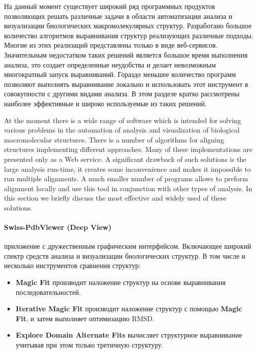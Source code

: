 \documentclass[a4paper, 12pt, titlepage, utf8]{extarticle}
\begin{document}
\begin{original}
На данный момент существует широкий ряд программных продуктов позволяющих решать
различные задачи в области автоматизации анализа и визуализации биологических
макромолекулярных структур. Разработано большое количество алгоритмов
выравнивания структур реализующих различные подходы. Многие из этих реализаций
представлены только в виде веб-сервисов. Значительным недостатком таких решений
является большое время выполнения анализа, это создает определенные неудобства и
делает невозможным многократный запуск выравниваний. Гораздо меньшее количество
программ позволяют выполнять выравнивание локально и использовать этот
инструмент в совокупности с другими видами анализа. В этом разделе кратко
рассмотрены наиболее эффективные и широко используемые из таких решений.
\begin{original}

At the moment there is a wide range of software which is intended for solving
various problems in the automation of analysis and visualization of biological
macromolecular structures. There is a number of algorithms for aligning
structures implementing different approaches. Many of these implementations are
presented only as a Web service. A significant drawback of such solutions is the
large analysis run-time, it creates some inconvenience and makes it impossible
to run multiple alignments. A much smaller number of programs allows to preform
alignment locally and use this tool in conjunction with other types of analysis.
In this section we briefly discuss the most effective and widely used of these
solutions.

\begin{original}
\paragraph{Swiss-PdbViewer (Deep View) \cite{deep-view}}
приложение с дружественным графическим интерфейсом. Включающее широкий спектр
средств анализа и визуализации биологических структур. В том числе и несколько
инструментов сравнения структур:
\begin{itemize}
    \item \textbf{Magic Fit} производит наложение структур на основе
выравнивания последовательностей.
    \item \textbf{Iterative Magic Fit} производит наложение структур с помощью
\textbf{Magic Fit}, и затем выполняет оптимизацию RMSD.
    \item \textbf{Explore Domain Alternate Fits} вычисляет структурное
выравнивание учитывая при этом только третичную структуру.
\end{itemize}
\end{original}


\end{original}
\end{original}
\end{document}
